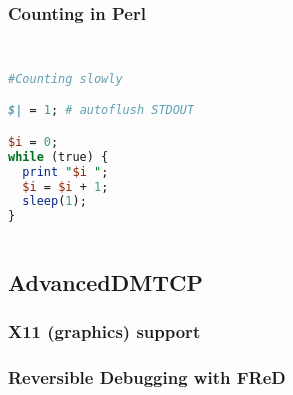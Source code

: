 \documentclass[compress]{beamer}
\begin{document}
\begin{frame}[fragile]
\frametitle{Counting in Perl}

\begin{columns}[t]

\begin{lstlisting}[basicstyle=\ttfamily, language=Perl, showstringspaces=false]

#Counting slowly

$| = 1; # autoflush STDOUT

$i = 0;
while (true) {
  print "$i ";
  $i = $i + 1;
  sleep(1);
}
\end{lstlisting}



\end{columns}


\end{frame}


\subsection{AdvancedDMTCP}    %

\begin{frame}
\frametitle{X11 (graphics) support}


\end{frame}



\begin{frame}
\frametitle{Reversible Debugging with FReD}




\end{frame}

\end{document}
